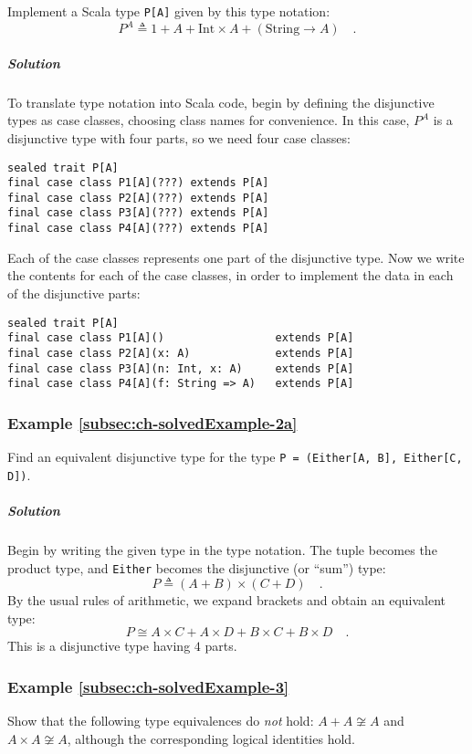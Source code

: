 Implement a Scala type \lstinline!P[A]! given by this type notation:
\[
P^{A}\triangleq1+A+\text{Int}\times A+(\text{String}\rightarrow A)\quad.
\]


\subparagraph{Solution}

To translate type notation into Scala code, begin by defining the
disjunctive types as case classes, choosing class names for convenience.
In this case, $P^{A}$ is a disjunctive type with four parts, so we
need four case classes:
\begin{lstlisting}
sealed trait P[A]
final case class P1[A](???) extends P[A]
final case class P2[A](???) extends P[A]
final case class P3[A](???) extends P[A]
final case class P4[A](???) extends P[A]
\end{lstlisting}
Each of the case classes represents one part of the disjunctive type.
Now we write the contents for each of the case classes, in order to
implement the data in each of the disjunctive parts:
\begin{lstlisting}
sealed trait P[A]
final case class P1[A]()                 extends P[A]
final case class P2[A](x: A)             extends P[A]
final case class P3[A](n: Int, x: A)     extends P[A]
final case class P4[A](f: String => A)   extends P[A]
\end{lstlisting}


\subsubsection{Example \label{subsec:ch-solvedExample-2a}\ref{subsec:ch-solvedExample-2a}}

Find an equivalent disjunctive type for the type \lstinline!P = (Either[A, B], Either[C, D])!.

\subparagraph{Solution}

Begin by writing the given type in the type notation. The tuple becomes
the product type, and \lstinline!Either! becomes the disjunctive
(or \textsf{``}sum\textsf{''}) type:
\[
P\triangleq(A+B)\times(C+D)\quad.
\]
By the usual rules of arithmetic, we expand brackets and obtain an
equivalent type:
\[
P\cong A\times C+A\times D+B\times C+B\times D\quad.
\]
This is a disjunctive type having $4$ parts.

\subsubsection{Example \label{subsec:ch-solvedExample-3}\ref{subsec:ch-solvedExample-3}}

Show that the following type equivalences do \emph{not} hold: $A+A\not\cong A$
and $A\times A\not\cong A$, although the corresponding logical identities
hold.

